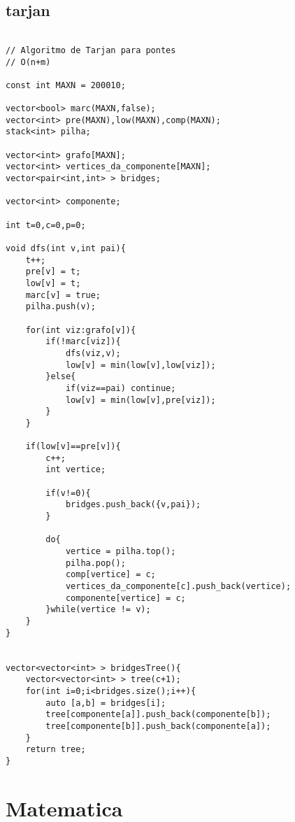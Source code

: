 \documentclass[landscape,twocolumn,10pt,a4paper]{article}
\begin{document}
\subsection{tarjan}
\begin{verbatim}

// Algoritmo de Tarjan para pontes
// O(n+m)

const int MAXN = 200010;

vector<bool> marc(MAXN,false);
vector<int> pre(MAXN),low(MAXN),comp(MAXN);
stack<int> pilha;

vector<int> grafo[MAXN];
vector<int> vertices_da_componente[MAXN];
vector<pair<int,int> > bridges;

vector<int> componente;

int t=0,c=0,p=0;

void dfs(int v,int pai){
    t++;
    pre[v] = t;
    low[v] = t;
    marc[v] = true;
    pilha.push(v);

    for(int viz:grafo[v]){
        if(!marc[viz]){
            dfs(viz,v);
            low[v] = min(low[v],low[viz]);
        }else{
            if(viz==pai) continue;
            low[v] = min(low[v],pre[viz]);
        }
    }

    if(low[v]==pre[v]){
        c++;
        int vertice;

        if(v!=0){
            bridges.push_back({v,pai});
        }

        do{
            vertice = pilha.top();
            pilha.pop();
            comp[vertice] = c;
            vertices_da_componente[c].push_back(vertice);
            componente[vertice] = c;
        }while(vertice != v);
    }
}


vector<vector<int> > bridgesTree(){
    vector<vector<int> > tree(c+1);
    for(int i=0;i<bridges.size();i++){
        auto [a,b] = bridges[i];
        tree[componente[a]].push_back(componente[b]);
        tree[componente[b]].push_back(componente[a]);
    }
    return tree;
}
\end{verbatim}

\section{Matematica}
\end{document}
